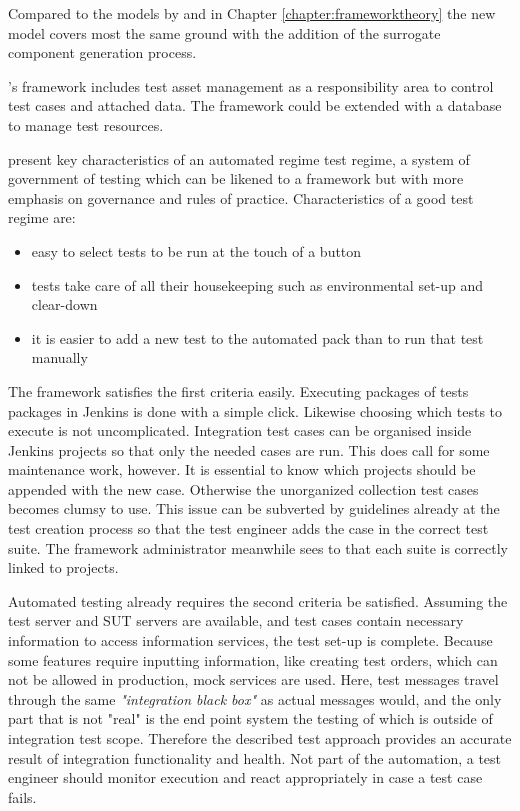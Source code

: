 \documentclass[12pt,a4paper,oneside,pdftex]{report}
\begin{document}
{Compared to the models by \citet{liu2009unified} and \citet{huang2008surrogate} in Chapter \ref{chapter:frameworktheory} the new model covers most the same ground with the addition of the surrogate component generation process. 

\citeauthor{laukkanen2006data}'s \citeyearpar{laukkanen2006data} framework includes test asset management as a responsibility area to control test cases and attached data. The framework could be extended with a database to manage test resources.

\citet{fewster1999software} present key characteristics of an automated regime test regime, a system of government of testing which can be likened to a framework but with more emphasis on governance and rules of practice. Characteristics of a good test regime are:
\begin{itemize}
\item easy to select tests to be run at the touch of a button
\item tests take care of all their housekeeping such as environmental set-up and clear-down
\item it is easier to add a new test to the automated pack than to run that test manually
\end{itemize}

The framework satisfies the first criteria easily. Executing packages of tests packages in Jenkins is done with a simple click. Likewise choosing which tests to execute is not uncomplicated. Integration test cases can be organised inside Jenkins projects so that only the needed cases are run. This does call for some maintenance work, however. It is essential to know which projects should be appended with the new case. Otherwise the unorganized collection test cases becomes clumsy to use. This issue can be subverted by guidelines already at the test creation process so that the test engineer adds the case in the correct test suite. The framework administrator meanwhile sees to that each suite is correctly linked to projects.

Automated testing already requires the second criteria be satisfied. Assuming the test server and SUT servers are available, and test cases contain necessary information to access information services, the test set-up is complete. Because some features require inputting information, like creating test orders, which can not be allowed in production, mock services are used. Here, test messages travel through the same \emph{"integration black box"} as actual messages would, and the only part that is not "real" is the end point system the testing of which is outside of integration test scope. Therefore the described test approach provides an accurate result of integration functionality and health. Not part of the automation, a test engineer should monitor execution and react appropriately in case a test case fails.

}
\end{document}
